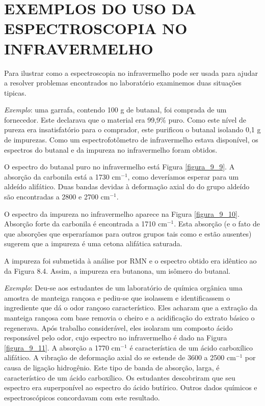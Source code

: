 \section{EXEMPLOS DO USO DA ESPECTROSCOPIA NO INFRAVERMELHO}
Para ilustrar como a espectroscopia no infravermelho pode ser usada para ajudar a resolver problemas encontrados no laboratório examinemos duas situações tipicas.

\noindent \textit{Exemplo}: uma garrafa, contendo 100 g de butanal, foi comprada de um fornecedor. Este declarava que o material era 99,9\% puro. Como este nível de pureza era insatisfatório para o comprador, este purificou o butanal isolando 0,1 g de impurezas. Como um espectrofotômetro de infravermelho estava disponível, os espectros do butanal e da impureza no infravermelho foram obtidos.

O espectro do butanal puro no infravermelho está Figura \ref{figura_9_9}. A absorção da carbonila está a 1730 cm$^{-1}$, como deveríamos esperar para um aldeído alifático. Duas bandas devidas à deformação axial do  do grupo aldeído são encontradas a 2800 e 2700 cm$^{-1}$.

O espectro da impureza no infravermelho aparece na Figura \ref{figura_9_10}. Absorção forte da carbonila é encontrada a 1710 cm$^{-1}$. Esta absorção (e o fato de que absorções que esperaríamos para outros grupos tais como  e  estão ausentes) sugerem que a impureza é uma cetona alifática saturada.

A impureza foi submetida à análise por RMN e o espectro obtido era idêntico ao da Figura 8.4. Assim, a impureza era butanona, um isômero do butanal.

\noindent\textit{Exemplo}: Deu-se aos estudantes de um laboratório de química orgânica uma amostra de manteiga rançosa e pediu-se que isolassem e identificassem o ingrediente que dá o odor rançoso característico. Eles acharam que a extração da manteiga rançosa com base removia o cheiro e a acidificação do extrato básico o regenerava. Após trabalho considerável, eles isolaram um composto ácido responsável pelo odor, cujo espectro no infravermelho é dado na Figura \ref{figura_9_11}. A absorção a 1770 cm$^{-1}$ é característica de um ácido carboxílico alifático. A vibração de deformação axial do  se estende de 3600 a 2500 cm$^{-1}$ por causa de ligação hidrogênio. Este tipo de banda de absorção, larga, é característico de um ácido carboxílico. Os estudantes descobriram que seu espectro era superponível ao espectro do ácido butírico. Outros dados químicos e espectroscópicos concordavam com este resultado.

